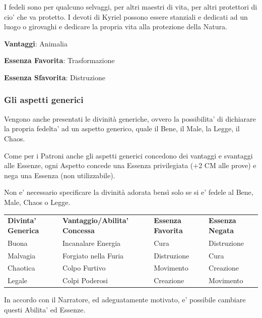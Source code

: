 \documentclass[a4paper,11pt,twoside,openany]{book}
\begin{document}
I fedeli sono per qualcuno selvaggi, per altri maestri di vita, per altri protettori di cio' che va protetto. I devoti di Kyriel possono essere stanziali e dedicati ad un luogo o girovaghi e dedicare la propria vita alla protezione della Natura.


\textbf{Vantaggi}: Animalia

\textbf{Essenza Favorita}: Trasformazione

\textbf{Essenza Sfavorita}: Distruzione
\bigskip

\subsubsection{Gli aspetti generici}

\medskip

Vengono anche presentati le divinità generiche, ovvero la possibilita' di dichiarare la propria fedelta' ad un aspetto generico, quale il Bene, il Male, la Legge, il Chaos.

Come per i Patroni anche gli aspetti generici concedono dei vantaggi e svantaggi alle Essenze, ogni Aspetto concede una Essenza privilegiata (+2 CM alle prove) e nega una Essenza (non utilizzabile).

Non e' necessario specificare la divinità adorata bensì solo se si e' fedele al Bene, Male, Chaos o Legge.

\medskip

\begin{tabular}{llll}
\toprule
\textbf{Divinta' Generica}	& \textbf{Vantaggio/Abilita' Concessa} & \textbf{Essenza Favorita} & \textbf{Essenza Negata} \\
Buona	& Incanalare Energia & Cura & Distruzione \\
Malvagia	&  Forgiato nella Furia &Distruzione  & Cura \\
Chaotica	&  Colpo Furtivo&Movimento  & Creazione \\
Legale & Colpi Poderosi & Creazione &  Movimento\\
\end{tabular}

\bigskip

In accordo con il Narratore, ed adeguatamente motivato, e' possibile cambiare questi Abilita' ed Essenze.






\pagebreak
\end{document}
